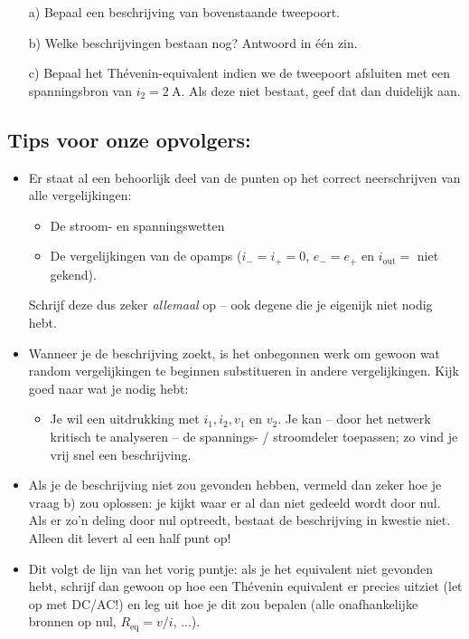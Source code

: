\documentclass{kuburgiearticle}
\begin{document}
	\vspace{0.5cm}

	\begin{enumerate}
		\item[a)] Bepaal een beschrijving van bovenstaande tweepoort.
		\item[b)] Welke beschrijvingen bestaan nog? Antwoord in één zin.
		\item[c)] Bepaal het Thévenin-equivalent indien we de tweepoort afsluiten met een spanningsbron van \({i_2=\SI{2}{\ampere}}\). Als deze niet bestaat, geef dat dan duidelijk aan.
	\end{enumerate}

	\vspace{2cm}

	\subsection*{Tips voor onze opvolgers:}
	\begin{itemize}
		\item Er staat al een behoorlijk deel van de punten op het correct neerschrijven van alle vergelijkingen:
		\begin{itemize}
			\item De stroom- en spanningswetten
			\item De vergelijkingen van de opamps (\(i_- = i_+ = 0\), $e_-=e_+$ en $i_\text{out} = $ niet gekend).
		\end{itemize}
		Schrijf deze dus zeker \textit{allemaal} op -- ook degene die je eigenijk niet nodig hebt.
		\item Wanneer je de beschrijving zoekt, is het onbegonnen werk om gewoon wat random vergelijkingen te beginnen substitueren in andere vergelijkingen. Kijk goed naar wat je nodig hebt:
		\begin{itemize}
			\item Je wil een uitdrukking met \(i_1, i_2, v_1\) en \(v_2\). Je kan -- door het netwerk kritisch te analyseren -- de spannings- / stroomdeler toepassen; zo vind je vrij snel een beschrijving.
		\end{itemize}
		\item Als je de beschrijving niet zou gevonden hebben, vermeld dan zeker hoe je vraag b) zou oplossen: je kijkt waar er al dan niet gedeeld wordt door nul. Als er zo'n deling door nul optreedt, bestaat de beschrijving in kwestie niet. Alleen dit levert al een half punt op!
		\item Dit volgt de lijn van het vorig puntje: als je het equivalent niet gevonden hebt, schrijf dan gewoon op hoe een Thévenin equivalent er precies uitziet (let op met DC/AC!) en leg uit hoe je dit zou bepalen (alle onafhankelijke bronnen op nul, \(R_\text{eq}=v/i\), ...).
	\end{itemize}
\end{document}
